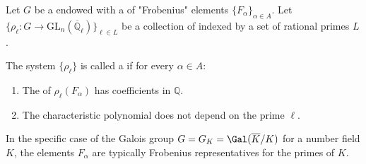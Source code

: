 \begin{definition} \label{definition:compatible_system_of_representations_on_a_profinite_group_equipped_with_dense_frobenius_elements}
Let $G$ be a  endowed with a  of "Frobenius" elements $\{F_\alpha\}_{\alpha \in A}$. Let $\{ \rho_\ell: G \to \mathrm{GL}_n(\overline{\mathbb{Q}}_\ell) \}_{\ell \in L}$ be a collection of  indexed by a set of rational primes $L$. 

The system $\{\rho_\ell\}$ is called a  if for every $\alpha \in A$:
\begin{enumerate}
    \item The  of $\rho_\ell(F_\alpha)$ has coefficients in $\mathbb{Q}$.
    \item The characteristic polynomial does not depend on the prime $\ell$.
\end{enumerate}
In the specific case of the Galois group $G = G_K = \Gal(\overline{K}/K)$ for a number field $K$, the elements $F_\alpha$ are typically Frobenius representatives for the primes of $K$.

\end{definition}